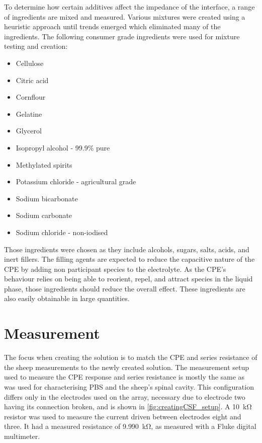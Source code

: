   To determine how certain additives affect the impedance of the interface, a range of ingredients are mixed and measured.
  Various mixtures were created using a heuristic approach until trends emerged which eliminated many of the ingredients.
  The following consumer grade ingredients were used for mixture testing and creation:
  \begin{itemize}
      \item Cellulose
      \item Citric acid
      \item Cornflour
      \item Gelatine
      \item Glycerol
      \item Isopropyl alcohol - 99.9\% pure
      \item Methylated spirits
      \item Potassium chloride - agricultural grade
      \item Sodium bicarbonate
      \item Sodium carbonate
      \item Sodium chloride - non-iodised
  \end{itemize}

  Those ingredients were chosen as they include alcohols, sugars, salts, acids, and inert fillers.
  The filling agents are expected to reduce the capacitive nature of the CPE by adding non participant species to the electrolyte.
  As the CPE's behaviour relies on being able to reorient, repel, and attract species in the liquid phase, those ingredients should reduce the overall effect.
  These ingredients are also easily obtainable in large quantities.


\section{Measurement}

  The focus when creating the solution is to match the CPE and series resistance of the sheep measurements to the newly created solution.
  The measurement setup used to measure the CPE response and series resistance is mostly the same as was used for characterising PBS and the sheep's spinal cavity.
  This configuration differs only in the electrodes used on the array, necessary due to electrode two having its connection broken, and is shown in \cref{fig:creatingCSF_setup}.
  A \SI{10}{\kilo\ohm} resistor was used to measure the current driven between electrodes eight and three.
  It had a measured resistance of \SI{9.990}{\kilo\ohm}, as measured with a Fluke digital multimeter.

